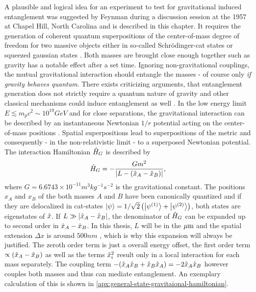 A plausible and logical idea for an experiment to test for gravitational induced entanglement was suggested by Feynman during a discussion session at the 1957  at Chapel Hill, North Carolina \cite[p. 247-260]{Rickles_2011} and is described in this chapter.
It requires the generation of coherent quantum superpositions of the center-of-mass degree of freedom for two massive objects either in so-called Schrödinger-cat states or squeezed gaussian states \cite{Bose_2017, Pedernales_2023}.
Both masses are brought close enough together such as gravity has a notable effect after a set time.
Ignoring non-gravitational couplings, the mutual gravitational interaction should entangle the masses - of course only \textit{if gravity behaves quantum}.
There exists criticizing arguments, that entanglement generation does not strictly require a quantum nature of gravity and other classical mechanisms could induce entanglement as well \cite{Reginatto_2019}.
In the low energy limit $E\lesssim m_p c^2 \sim 10^{19}\si{GeV}$ and for close separations, the gravitational interaction can be described by an instantaneous Newtonian $1/r$ potential acting on the center-of-mass positions \cite{Carney_2018,Pedernales_2023,Christodoulou_2022}.
Spatial superpositions lead to superpositions of the metric and consequently - in the non-relativistic limit - to a superposed Newtonian potential.
The interaction Hamiltonian $\hat{H}_G$ is described by
\begin{equation}\label{eq:2:gravity-hamiltonian}
  \hat{H}_G = - \frac{Gm^2}{\left\lvert L - (\hat{x}_A - \hat{x}_B)\right\rvert} ,
\end{equation}
where $G=6.6743 \times 10^{-11} \si{m^3 kg^{-1} s^{-2}}$ is the gravitational constant. 
The positions $x_A$ and $x_B$ of the both masses $A$ and $B$ have been canonically quantized and if they are delocalized in cat-states $\ket{\psi} = 1/\sqrt{2}\left(\ket{\psi^{(1)}} + \ket{\psi^{(2)}}\right)$, both states are eigenstates of $\hat{x}$.
If $L \gg \left\lvert\hat{x}_A - \hat{x}_B\right\rvert$, the denominator of $\hat{H}_G$ can be expanded up to second order in $\hat{x}_A - \hat{x}_B$. In this thesis, $L$ will be in the $\mathrm{\mu m}$ and the spatial extension $\Delta x$ is around $500\si{nm}$ \cite{Fein_2019}, which is why this expansion will always be justified.
The zeroth order term is just a overall energy offset, the first order term $\propto (\hat{x}_A - \hat{x}_B)$ as well as the terms $\hat{x}^2_i$ result only in a local interaction for each mass separately. The coupling term $ - (\hat{x}_A\hat{x}_B + \hat{x}_B\hat{x}_A) = -2\hat{x}_A\hat{x}_B$ however couples both masses and thus can mediate entanglement. An exemplary calculation of this is shown in \cref{apx:general-state-gravitaional-hamiltonian}.

